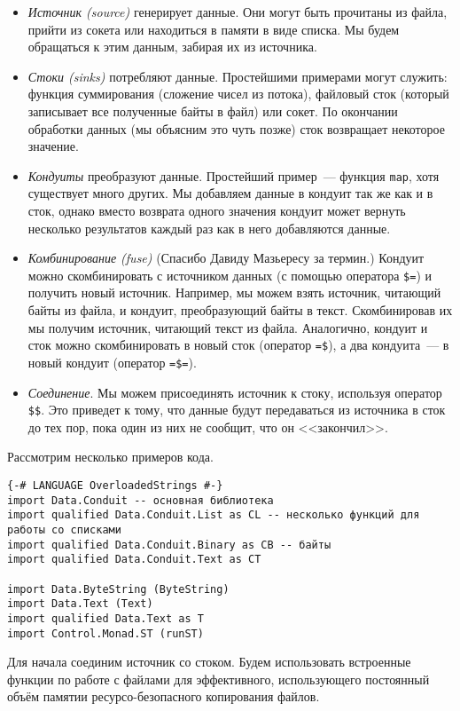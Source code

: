 \begin{itemize}
 \item \emph{Источник (source)} генерирует данные. Они могут быть прочитаны из файла, прийти из
сокета или находиться в памяти в виде списка. Мы будем обращаться к этим данным, забирая их из
источника.

 \item \emph{Стоки (sinks)} потребляют данные. 
 Простейшими примерами могут служить: функция суммирования (сложение чисел из потока), файловый сток (который записывает все полученные байты в файл) или сокет.
По окончании обработки данных (мы объясним это чуть позже) сток возвращает некоторое значение.

 \item \emph{Кондуиты} преобразуют данные. Простейший пример~--- функция
\lstinline=map=,
хотя существует много других. Мы добавляем данные в кондуит так же как и в сток, однако вместо
возврата одного значения кондуит может вернуть несколько результатов каждый раз
как в него добавляются данные.

  \item \emph{Комбинирование (fuse)} (Спасибо Давиду Мазьересу за термин.) Кондуит можно 
скомбинировать с источником данных (с помощью оператора \lstinline#$=#) и получить
новый источник. Например, мы можем взять источник, читающий байты из файла, и
кондуит, преобразующий байты в текст. Скомбинировав их мы получим 
источник, читающий текст из файла. Аналогично, кондуит и сток можно скомбинировать в новый сток
(оператор \verb#=$#), а два кондуита~--- в новый кондуит (оператор \verb#=$=#).

  \item \emph{Соединение}. Мы можем присоединять источник к стоку, используя оператор
\verb=$$=.
Это приведет к тому, что данные будут передаваться из источника в сток до тех пор, пока
один из них не сообщит, что он <<закончил>>.
\end{itemize}

Рассмотрим несколько примеров кода.
\begin{lstlisting}
{-# LANGUAGE OverloadedStrings #-}
import Data.Conduit -- основная библиотека
import qualified Data.Conduit.List as CL -- несколько функций для работы со списками
import qualified Data.Conduit.Binary as CB -- байты
import qualified Data.Conduit.Text as CT

import Data.ByteString (ByteString)
import Data.Text (Text)
import qualified Data.Text as T
import Control.Monad.ST (runST)
\end{lstlisting}
Для начала соединим источник со стоком. Будем использовать встроенные 
функции по работе с файлами для эффективного, использующего постоянный объём памятии ресурсо-безопасного копирования файлов.

